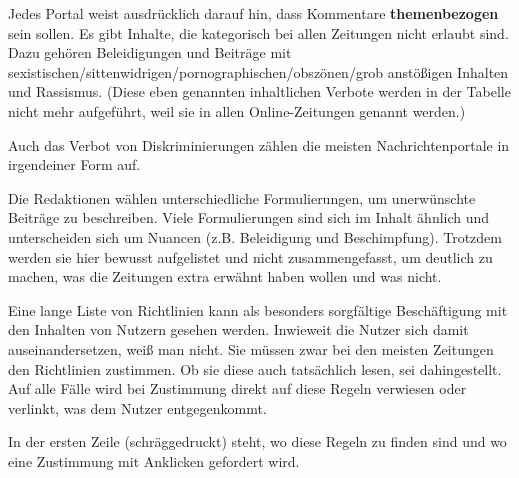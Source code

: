 Jedes Portal weist ausdrücklich darauf hin, dass Kommentare {\bfseries
themenbezogen} sein sollen.  Es gibt Inhalte, die kategorisch bei allen
Zeitungen nicht erlaubt sind. Dazu gehören Beleidigungen und Beiträge mit
se\-xi\-sti\-schen/sit\-ten\-wi\-dri\-gen/por\-no\-gra\-phi\-schen/obs\-zö\-nen/grob
anstößigen Inhalten und Rassismus. (Diese eben genannten inhaltlichen Verbote
werden in der Tabelle nicht mehr aufgeführt, weil sie in allen Online-Zeitungen
genannt werden.)

Auch das Verbot von Diskriminierungen zählen die meisten Nachrichtenportale in
irgendeiner Form auf.

Die Redaktionen wählen unterschiedliche Formulierungen, um unerwünschte Beiträge
zu beschreiben. Viele Formulierungen sind sich im Inhalt ähnlich  und
unterscheiden sich um Nuancen (z.B. Beleidigung und Beschimpfung). Trotzdem
werden sie hier bewusst aufgelistet und nicht zusammengefasst, um deutlich zu
machen, was die Zeitungen extra erwähnt haben wollen und was nicht.

Eine lange Liste von Richtlinien kann als besonders sorgfältige Beschäftigung
mit den Inhalten von Nutzern gesehen werden. Inwieweit die Nutzer sich damit
auseinandersetzen, weiß man nicht. Sie müssen zwar bei den meisten Zeitungen den
Richtlinien zustimmen. Ob sie diese auch tatsächlich lesen, sei dahingestellt.
Auf alle Fälle wird bei Zustimmung direkt auf diese Regeln verwiesen oder
verlinkt, was dem Nutzer entgegenkommt.

In der ersten Zeile (schräggedruckt) steht, wo diese Regeln zu finden sind und
wo eine Zustimmung mit Anklicken gefordert wird.

\pagebreak

